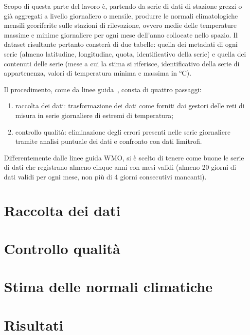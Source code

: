 
Scopo di questa parte del lavoro è, partendo da serie di dati di stazione grezzi o già aggregati a livello giornaliero o mensile, produrre le normali climatologiche mensili georiferite sulle stazioni di rilevazione, ovvero medie delle temperature massime e minime giornaliere per ogni mese dell'anno collocate nello spazio. Il dataset risultante pertanto consterà di due tabelle: quella dei metadati di ogni serie (almeno latitudine, longitudine, quota, identificativo della serie) e quella dei contenuti delle serie (mese a cui la stima si riferisce, identificativo della serie di appartenenza, valori di temperatura minima e massima in \(\unit{\degreeCelsius}\)).

Il procedimento, come da linee guida~\cite{WMOGuidelinesNormalsCalculation2017}, consta di quattro passaggi:

\begin{enumerate}
  \item raccolta dei dati: trasformazione dei dati come forniti dai gestori
    delle reti di misura in serie giornaliere di estremi di temperatura;
  \item controllo qualità: eliminazione degli errori presenti nelle serie
    giornaliere tramite analisi puntuale dei dati e confronto con dati
    limitrofi.
\end{enumerate}

Differentemente dalle linee guida WMO, si è scelto di tenere come buone le serie di dati che registrano almeno cinque anni con mesi validi (almeno 20 giorni di dati validi per ogni mese, non più di 4 giorni consecutivi mancanti).

\section{Raccolta dei dati}\label{ch:raccolta-dati}


\section{Controllo qualità}\label{ch:qc}


\section{Stima delle normali climatiche}\label{ch:clino}


\section{Risultati}\label{ch:risultati}

